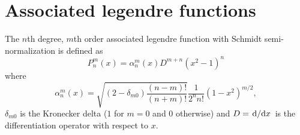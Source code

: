 \documentclass[12pt]{article}
\begin{document}
\section{Associated legendre functions}

The $n$th degree, $m$th order associated legendre function with Schmidt semi-normalization is defined as \parencite{Winch2005}
\begin{equation}
  P_n^m(x) = \alpha_n^m(x)D^{m+n}(x^2-1)^n
\end{equation}
where
\begin{equation}\label{eq:alpha}
  \alpha_n^m(x) = \sqrt{(2-\delta_{m0})\frac{(n-m)!}{(n+m)!}}\frac{1}{2^nn!}(1-x^2)^{m/2},
\end{equation}
$\delta_{m0}$ is the Kronecker delta ($1$ for $m=0$ and $0$ otherwise) and $D = \derivative*{x}$ is the differentiation operator with respect to $x$.
\end{document}
